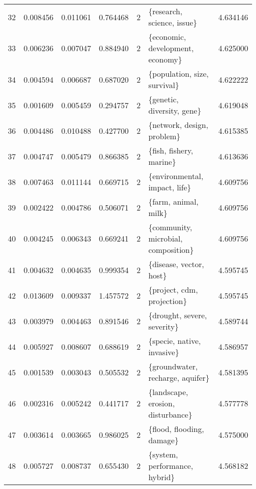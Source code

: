 \begin{tabular}{lrrrrlr}
32  &    0.008456 &  0.011061 &        0.764468 &           2 &              \{research, science, issue\} &  4.634146 \\
33  &    0.006236 &  0.007047 &        0.884940 &           2 &        \{economic, development, economy\} &  4.625000 \\
34  &    0.004594 &  0.006687 &        0.687020 &           2 &            \{population, size, survival\} &  4.622222 \\
35  &    0.001609 &  0.005459 &        0.294757 &           2 &              \{genetic, diversity, gene\} &  4.619048 \\
36  &    0.004486 &  0.010488 &        0.427700 &           2 &              \{network, design, problem\} &  4.615385 \\
37  &    0.004747 &  0.005479 &        0.866385 &           2 &                 \{fish, fishery, marine\} &  4.613636 \\
38  &    0.007463 &  0.011144 &        0.669715 &           2 &           \{environmental, impact, life\} &  4.609756 \\
39  &    0.002422 &  0.004786 &        0.506071 &           2 &                    \{farm, animal, milk\} &  4.609756 \\
40  &    0.004245 &  0.006343 &        0.669241 &           2 &     \{community, microbial, composition\} &  4.609756 \\
41  &    0.004632 &  0.004635 &        0.999354 &           2 &                 \{disease, vector, host\} &  4.595745 \\
42  &    0.013609 &  0.009337 &        1.457572 &           2 &              \{project, cdm, projection\} &  4.595745 \\
43  &    0.003979 &  0.004463 &        0.891546 &           2 &             \{drought, severe, severity\} &  4.589744 \\
44  &    0.005927 &  0.008607 &        0.688619 &           2 &              \{specie, native, invasive\} &  4.586957 \\
45  &    0.001539 &  0.003043 &        0.505532 &           2 &        \{groundwater, recharge, aquifer\} &  4.581395 \\
46  &    0.002316 &  0.005242 &        0.441717 &           2 &       \{landscape, erosion, disturbance\} &  4.577778 \\
47  &    0.003614 &  0.003665 &        0.986025 &           2 &               \{flood, flooding, damage\} &  4.575000 \\
48  &    0.005727 &  0.008737 &        0.655430 &           2 &           \{system, performance, hybrid\} &  4.568182 \\

\end{tabular}
